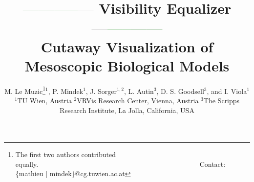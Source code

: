 
\usepackage{xcolor}



\title[Visibility Equalizer]%
      {\textcolor{darkgreen}{------}\textcolor{green}{-----}\textcolor{grey}{---} Visibility Equalizer \textcolor{grey}{---}\textcolor{green}{-----}\textcolor{darkgreen}{------} \\ Cutaway Visualization of Mesoscopic Biological Models}

\author[Le Muzic, Mindek et al.]
       {M. Le Muzic\thanks{The first two authors contributed equally.~~~~~~~~~~~~~~~~~~~~~~~~~~~~~~~~~~~~~~~~~~~~~~\textcolor{white}{.}
        Contact: \{mathieu | mindek\}@cg.tuwien.ac.at}$^{1}$,
        P. Mindek$^{1}$,
        J. Sorger$^{1,2}$,
        L. Autin$^{3}$,
        D. S. Goodsell$^{3}$,
        and I. Viola$^{1}$        
        \\
         $^1$TU Wien, Austria \hspace{4mm}$^2$VRVis Research Center, Vienna, Austria \hspace{4mm}$^3$The Scripps Research Institute, La Jolla, California, USA
       }



%




